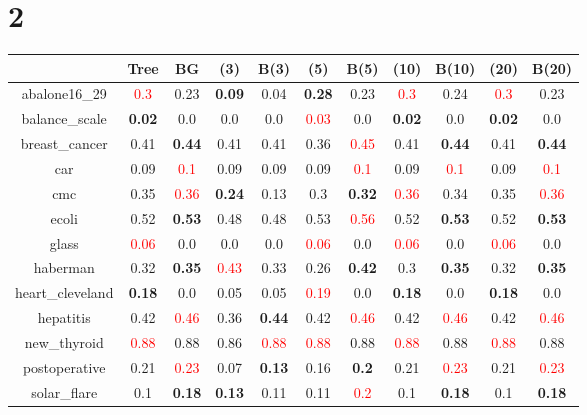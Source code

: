 \documentclass{article}%
\begin{document}
\section*{2}%
\begin{tabular}{c|cccccccccc}%
\hline%
&Tree&BG&(3)&B(3)&(5)&B(5)&(10)&B(10)&(20)&B(20)\\%
\hline%
abalone16\_29&\textcolor{red}{ 
0.3
}&0.23&\textbf{0.09}&0.04&\textbf{0.28}&0.23&\textcolor{red}{ 
0.3
}&0.24&\textcolor{red}{ 
0.3
}&0.23\\%
\hline%
balance\_scale&\textbf{0.02}&0.0&0.0&0.0&\textcolor{red}{ 
0.03
}&0.0&\textbf{0.02}&0.0&\textbf{0.02}&0.0\\%
\hline%
breast\_cancer&0.41&\textbf{0.44}&0.41&0.41&0.36&\textcolor{red}{ 
0.45
}&0.41&\textbf{0.44}&0.41&\textbf{0.44}\\%
\hline%
car&0.09&\textcolor{red}{ 
0.1
}&0.09&0.09&0.09&\textcolor{red}{ 
0.1
}&0.09&\textcolor{red}{ 
0.1
}&0.09&\textcolor{red}{ 
0.1
}\\%
\hline%
cmc&0.35&\textcolor{red}{ 
0.36
}&\textbf{0.24}&0.13&0.3&\textbf{0.32}&\textcolor{red}{ 
0.36
}&0.34&0.35&\textcolor{red}{ 
0.36
}\\%
\hline%
ecoli&0.52&\textbf{0.53}&0.48&0.48&0.53&\textcolor{red}{ 
0.56
}&0.52&\textbf{0.53}&0.52&\textbf{0.53}\\%
\hline%
glass&\textcolor{red}{ 
0.06
}&0.0&0.0&0.0&\textcolor{red}{ 
0.06
}&0.0&\textcolor{red}{ 
0.06
}&0.0&\textcolor{red}{ 
0.06
}&0.0\\%
\hline%
haberman&0.32&\textbf{0.35}&\textcolor{red}{ 
0.43
}&0.33&0.26&\textbf{0.42}&0.3&\textbf{0.35}&0.32&\textbf{0.35}\\%
\hline%
heart\_cleveland&\textbf{0.18}&0.0&0.05&0.05&\textcolor{red}{ 
0.19
}&0.0&\textbf{0.18}&0.0&\textbf{0.18}&0.0\\%
\hline%
hepatitis&0.42&\textcolor{red}{ 
0.46
}&0.36&\textbf{0.44}&0.42&\textcolor{red}{ 
0.46
}&0.42&\textcolor{red}{ 
0.46
}&0.42&\textcolor{red}{ 
0.46
}\\%
\hline%
new\_thyroid&\textcolor{red}{ 
0.88
}&0.88&0.86&\textcolor{red}{ 
0.88
}&\textcolor{red}{ 
0.88
}&0.88&\textcolor{red}{ 
0.88
}&0.88&\textcolor{red}{ 
0.88
}&0.88\\%
\hline%
postoperative&0.21&\textcolor{red}{ 
0.23
}&0.07&\textbf{0.13}&0.16&\textbf{0.2}&0.21&\textcolor{red}{ 
0.23
}&0.21&\textcolor{red}{ 
0.23
}\\%
\hline%
solar\_flare&0.1&\textbf{0.18}&\textbf{0.13}&0.11&0.11&\textcolor{red}{ 
0.2
}&0.1&\textbf{0.18}&0.1&\textbf{0.18}\\%

\end{tabular}
\end{document}
